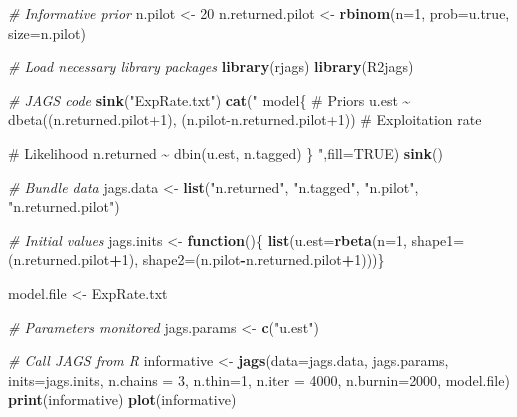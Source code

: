 \documentclass[
]{krantz}
\makeatletter
\newenvironment{Shaded}{\begin{snugshade}}{\end{snugshade}}
\newcommand{\AttributeTok}[1]{\textcolor[rgb]{0.27,0.27,0.27}{#1}}
\newcommand{\CommentTok}[1]{\textcolor[rgb]{0.37,0.37,0.37}{\textit{#1}}}
\newcommand{\ConstantTok}[1]{\textcolor[rgb]{0.37,0.37,0.37}{#1}}
\newcommand{\ControlFlowTok}[1]{\textcolor[rgb]{0.27,0.27,0.27}{\textbf{#1}}}
\newcommand{\DecValTok}[1]{\textcolor[rgb]{0.06,0.06,0.06}{#1}}
\newcommand{\FunctionTok}[1]{\textcolor[rgb]{0.27,0.27,0.27}{\textbf{#1}}}
\newcommand{\NormalTok}[1]{#1}
\newcommand{\OtherTok}[1]{\textcolor[rgb]{0.37,0.37,0.37}{#1}}
\newcommand{\SpecialCharTok}[1]{\textcolor[rgb]{0.43,0.43,0.43}{\textbf{#1}}}
\newcommand{\StringTok}[1]{\textcolor[rgb]{0.5,0.5,0.5}{#1}}
\newenvironment{kframe}{%
\medskip{}
\setlength{\fboxsep}{.8em}
 \def\at@end@of@kframe{}%
 \ifinner\ifhmode%
  \def\at@end@of@kframe{\end{minipage}}%
  \begin{minipage}{\columnwidth}%
 \fi\fi%
 \def\FrameCommand##1{\hskip\@totalleftmargin \hskip-\fboxsep
 \colorbox{shadecolor}{##1}\hskip-\fboxsep
     \hskip-\linewidth \hskip-\@totalleftmargin \hskip\columnwidth}%
 \MakeFramed {\advance\hsize-\width
   \@totalleftmargin\z@ \linewidth\hsize
   \@setminipage}}%
 {\par\unskip\endMakeFramed%
 \at@end@of@kframe}
\renewenvironment{Shaded}{\begin{kframe}}{\end{kframe}}
\makeatother
\begin{document}
\begin{Shaded}
\begin{Highlighting}[]
\CommentTok{\# Informative prior}
\NormalTok{n.pilot }\OtherTok{\textless{}{-}} \DecValTok{20}
\NormalTok{n.returned.pilot }\OtherTok{\textless{}{-}} \FunctionTok{rbinom}\NormalTok{(}\AttributeTok{n=}\DecValTok{1}\NormalTok{, }\AttributeTok{prob=}\NormalTok{u.true, }\AttributeTok{size=}\NormalTok{n.pilot)}

\CommentTok{\# Load necessary library packages}
\FunctionTok{library}\NormalTok{(rjags)}
\FunctionTok{library}\NormalTok{(R2jags)}

\CommentTok{\# JAGS code}
\FunctionTok{sink}\NormalTok{(}\StringTok{"ExpRate.txt"}\NormalTok{)}
\FunctionTok{cat}\NormalTok{(}\StringTok{"}
\StringTok{model\{}
\StringTok{    \# Priors}
\StringTok{    u.est \textasciitilde{} dbeta((n.returned.pilot+1), }
\StringTok{         (n.pilot{-}n.returned.pilot+1)) \# Exploitation rate}

\StringTok{    \# Likelihood}
\StringTok{    n.returned \textasciitilde{} dbin(u.est, n.tagged)}
\StringTok{\}}
\StringTok{    "}\NormalTok{,}\AttributeTok{fill=}\ConstantTok{TRUE}\NormalTok{)}
\FunctionTok{sink}\NormalTok{()}

\CommentTok{\# Bundle data}
\NormalTok{jags.data }\OtherTok{\textless{}{-}} \FunctionTok{list}\NormalTok{(}\StringTok{"n.returned"}\NormalTok{, }\StringTok{"n.tagged"}\NormalTok{, }\StringTok{"n.pilot"}\NormalTok{, }
                  \StringTok{"n.returned.pilot"}\NormalTok{)}

\CommentTok{\# Initial values}
\NormalTok{jags.inits }\OtherTok{\textless{}{-}} \ControlFlowTok{function}\NormalTok{()\{ }\FunctionTok{list}\NormalTok{(}\AttributeTok{u.est=}\FunctionTok{rbeta}\NormalTok{(}\AttributeTok{n=}\DecValTok{1}\NormalTok{, }
                          \AttributeTok{shape1=}\NormalTok{(n.returned.pilot}\SpecialCharTok{+}\DecValTok{1}\NormalTok{), }
                          \AttributeTok{shape2=}\NormalTok{(n.pilot}\SpecialCharTok{{-}}\NormalTok{n.returned.pilot}\SpecialCharTok{+}\DecValTok{1}\NormalTok{)))\}}

\NormalTok{model.file }\OtherTok{\textless{}{-}} \StringTok{\textquotesingle{}ExpRate.txt\textquotesingle{}}

\CommentTok{\# Parameters monitored}
\NormalTok{jags.params }\OtherTok{\textless{}{-}} \FunctionTok{c}\NormalTok{(}\StringTok{"u.est"}\NormalTok{)}

\CommentTok{\# Call JAGS from R}
\NormalTok{informative }\OtherTok{\textless{}{-}} \FunctionTok{jags}\NormalTok{(}\AttributeTok{data=}\NormalTok{jags.data, jags.params, }\AttributeTok{inits=}\NormalTok{jags.inits,}
                \AttributeTok{n.chains =} \DecValTok{3}\NormalTok{, }\AttributeTok{n.thin=}\DecValTok{1}\NormalTok{, }\AttributeTok{n.iter =} \DecValTok{4000}\NormalTok{, }\AttributeTok{n.burnin=}\DecValTok{2000}\NormalTok{,}
\NormalTok{                model.file)}
\FunctionTok{print}\NormalTok{(informative)}
\FunctionTok{plot}\NormalTok{(informative)}


\end{Highlighting}
\end{Shaded}
\end{document}
